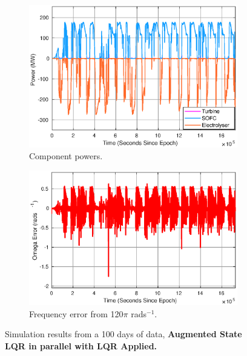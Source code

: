 \begin{figure}[ht]
\centering
\begin{subfigure}{.5\textwidth}
  \centering
  \includegraphics[width=1\linewidth]{images/results/LQR/use.eps}
  \caption{Component powers.}
  \label{fig:lqruse}
\end{subfigure}%
\begin{subfigure}{.5\textwidth}
  \centering
  \includegraphics[width=1\linewidth]{images/results/LQR/omega.eps}
  \caption{Frequency error from 120$\pi$ rads$^{-1}$.}
  \label{fig:lqromega}
\end{subfigure}
\caption{Simulation results from a 100 days of data, {\bf Augmented State LQR in parallel with LQR Applied.}}
\label{fig:lqrtest}
\end{figure}







